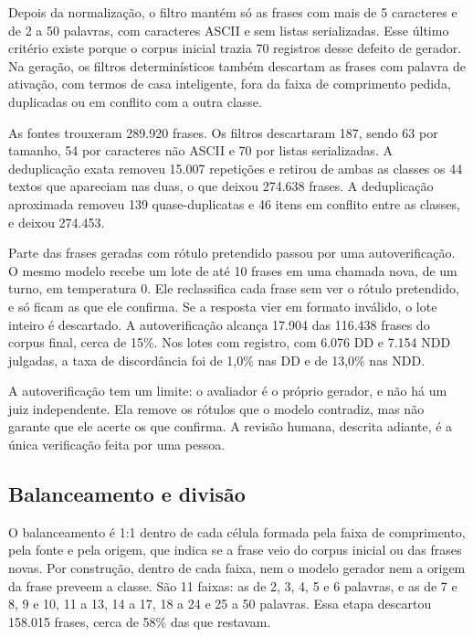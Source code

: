 \documentclass[
    12pt,                %
    openright,           %
    oneside,             %
    a4paper,             %
    english,             %
    brazil               %
]{abntex2}
\begin{document}
Depois da normalização, o filtro mantém só as frases com mais de 5 caracteres e de 2 a 50 palavras, com caracteres ASCII e sem listas serializadas. Esse último critério existe porque o corpus inicial trazia 70 registros desse defeito de gerador. Na geração, os filtros determinísticos também descartam as frases com palavra de ativação, com termos de casa inteligente, fora da faixa de comprimento pedida, duplicadas ou em conflito com a outra classe.

As fontes trouxeram 289.920 frases. Os filtros descartaram 187, sendo 63 por tamanho, 54 por caracteres não ASCII e 70 por listas serializadas. A deduplicação exata removeu 15.007 repetições e retirou de ambas as classes os 44 textos que apareciam nas duas, o que deixou 274.638 frases. A deduplicação aproximada removeu 139 quase-duplicatas e 46 itens em conflito entre as classes, e deixou 274.453.

Parte das frases geradas com rótulo pretendido passou por uma autoverificação. O mesmo modelo recebe um lote de até 10 frases em uma chamada nova, de um turno, em temperatura 0. Ele reclassifica cada frase sem ver o rótulo pretendido, e só ficam as que ele confirma. Se a resposta vier em formato inválido, o lote inteiro é descartado. A autoverificação alcança 17.904 das 116.438 frases do corpus final, cerca de 15\%. Nos lotes com registro, com 6.076 DD e 7.154 NDD julgadas, a taxa de discordância foi de 1,0\% nas DD e de 13,0\% nas NDD.

A autoverificação tem um limite: o avaliador é o próprio gerador, e não há um juiz independente. Ela remove os rótulos que o modelo contradiz, mas não garante que ele acerte os que confirma. A revisão humana, descrita adiante, é a única verificação feita por uma pessoa.


\subsection{Balanceamento e divisão}
\label{sec:balanceamento}

O balanceamento é 1:1 dentro de cada célula formada pela faixa de comprimento, pela fonte e pela origem, que indica se a frase veio do corpus inicial ou das frases novas. Por construção, dentro de cada faixa, nem o modelo gerador nem a origem da frase preveem a classe. São 11 faixas: as de 2, 3, 4, 5 e 6 palavras, e as de 7 e 8, 9 e 10, 11 a 13, 14 a 17, 18 a 24 e 25 a 50 palavras. Essa etapa descartou 158.015 frases, cerca de 58\% das que restavam.
\end{document}
